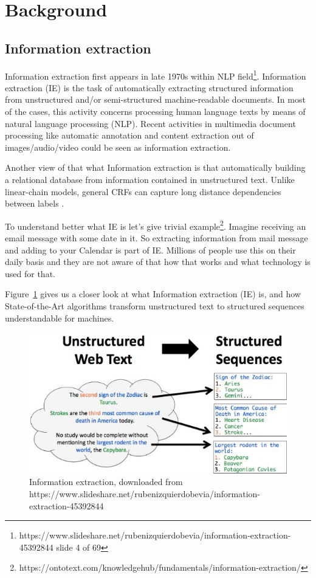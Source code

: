 \documentclass[thesis=M,english]{FITthesis}[2018/05/30]
\begin{document}
\section{Background}

\subsection{Information extraction}
	Information extraction first appears in late 1970s within NLP field\footnote{https://www.slideshare.net/rubenizquierdobevia/information-extraction-45392844 slide 4 of 69}. 
Information extraction (IE) \cite{wiki:IE} is the task of automatically extracting structured information from unstructured and/or semi-structured machine-readable documents. In most of the cases, this activity concerns processing human language texts by means of natural language processing (NLP). Recent activities in multimedia document processing like automatic annotation and content extraction out of images/audio/video could be seen as information extraction.

	Another view of that what Information extraction is that automatically building a relational database from information contained in unstructured text. Unlike linear-chain models, general CRFs can capture long distance dependencies between labels \cite{article:IE}.

	To understand better what IE is let's give trivial example\footnote{https://ontotext.com/knowledgehub/fundamentals/information-extraction/}. Imagine receiving an email message with some date in it. So extracting information from mail message and adding to your Calendar is part of IE. Millions of people use this on their daily basis and they are not aware of that how that works and what technology is used for that.

	Figure~\ref{fig:InformationExtraction} gives us a closer look at what Information extraction (IE) is, and how State-of-the-Art algorithms transform unstructured text to structured sequences understandable for machines. 

	\begin{figure}[H]\centering
		\includegraphics[width=\textwidth]{information-extraction}
		\caption{Information extraction, downloaded from https://www.slideshare.net/rubenizquierdobevia/information-extraction-45392844}\label{fig:InformationExtraction}
	\end{figure}
\end{document}
